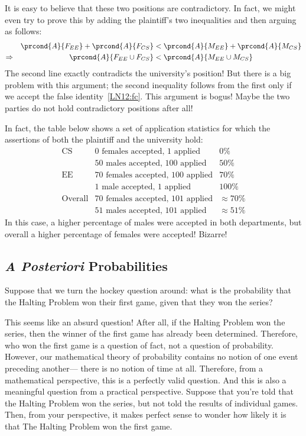 It is easy to believe that these two positions are contradictory.  In
fact, we might even try to prove this by adding the plaintiff's two
inequalities and then arguing as follows:
%
\begin{align*}
&& \prcond{A}{F_{EE}} + \prcond{A}{F_{CS}} & < 
	\prcond{A}{M_{EE}} + \prcond{A}{M_{CS}} \\
\Rightarrow && 
\prcond{A}{F_{EE} \cup F_{CS}} & <
	\prcond{A}{M_{EE} \cup M_{CS}}
\end{align*}
%
The second line exactly contradicts the university's position!  But there
is a big problem with this argument; the second inequality follows from
the first only if we accept the false identity~\eqref{LN12:fc}.  This argument
is bogus!  Maybe the two parties do not hold contradictory positions after
all!

In fact, the table below shows a set of application statistics for
which the assertions of both the plaintiff and the university hold:
%
\[
\begin{array}{crr}
\mbox{CS} & \mbox{0 females accepted, 1 applied} & 0\% \\
          & \mbox{50 males accepted, 100 applied} & 50\% \\
\mbox{EE} & \mbox{70 females accepted, 100 applied} & 70\% \\
          & \mbox{1 male accepted, 1 applied} & 100\% \\
\hline
\mbox{Overall} & \mbox{70 females accepted, 101 applied} & \approx 70\% \\
          & \mbox{51 males accepted, 101 applied} & \approx 51\%
\end{array}
\]
%
In this case, a higher percentage of males were accepted in both
departments, but overall a higher percentage of females were accepted!
Bizarre!

\subsection{\textit{A Posteriori} Probabilities}\label{aposteriori_subsec}

Suppose that we turn the hockey question around: what is the
probability that the Halting Problem won their first game, given that
they won the series?

This seems like an absurd question!  After all, if the Halting Problem
won the series, then the winner of the first game has already been
determined.  Therefore, who won the first game is a question of fact,
not a question of probability.  However, our mathematical theory of
probability contains no notion of one event preceding another--- there
is no notion of time at all.  Therefore, from a mathematical
perspective, this is a perfectly valid question.  And this is also a
meaningful question from a practical perspective.  Suppose that you're
told that the Halting Problem won the series, but not told the results
of individual games.  Then, from your perspective, it makes perfect
sense to wonder how likely it is that The Halting Problem won the
first game.

